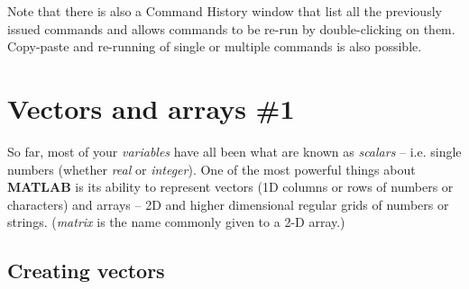 \documentclass{tufte-book} %
\begin{document}
Note that there is also a \textsf{Command History} window that list all the previously issued commands and allows commands to be re-run by double-clicking on them. Copy-paste and re-running of single or multiple commands is also possible.


\newpage


\section{Vectors and arrays \#1}

So far, most of your \textit{variables} have all been what are known as \textit{scalars} -- i.e. single numbers (whether \textit{real} or \textit{integer}).
One of the most powerful things about \textbf{MATLAB} is its ability to represent vectors (1D columns or rows of numbers or characters) and arrays -- 2D and higher dimensional regular grids of numbers or strings. (\textit{matrix} is the name commonly given to a 2-D array.)
 

\subsection{Creating vectors}
\end{document}

